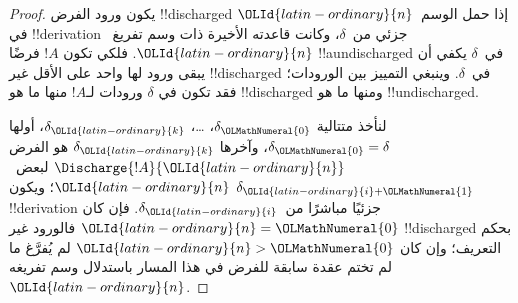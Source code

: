 \documentclass[../../../include/open-logic-section]{subfiles}
\begin{document}
\begin{proof}
  يكون ورود الفرض !!{discharged} إذا
  حمل الوسم~$\OLId{latin-ordinary}{n}$ في !!{derivation}
  جزئي من~$\delta$، وكانت قاعدته
  الأخيرة ذات وسم تفريغ~$\OLId{latin-ordinary}{n}$.
  فلكي تكون $!A$ فرضًا !!a{undischarged}
  في~$\delta$ يكفي أن يبقى ورود لها
  واحد على الأقل غير !!{discharged}
  في~$\delta$. وينبغي التمييز بين
  الورودات؛ فقد تكون في $\delta$
  ورودات لـ$!A$ منها ما هو
  !!{discharged} ومنها ما هو !!{undischarged}.

  لنأخذ متتالية $\delta_\OLMathNumeral{0}$، \dots،
  $\delta_\OLId{latin-ordinary}{k}$، أولها $\delta_\OLMathNumeral{0}=\delta$،
  وآخرها $\delta_\OLId{latin-ordinary}{k}$ هو الفرض
  $\Discharge{!A}{\OLId{latin-ordinary}{n}}$ لبعض~$\OLId{latin-ordinary}{n}$؛
  ويكون $\delta_{\OLId{latin-ordinary}{i}+\OLMathNumeral{1}}$ !!{derivation}
  جزئيًا مباشرًا من~$\delta_\OLId{latin-ordinary}{i}$.
  فإن كان $\OLId{latin-ordinary}{n}=\OLMathNumeral{0}$ فالورود غير !!{discharged}
  بحكم التعريف؛ وإن كان $\OLId{latin-ordinary}{n}>\OLMathNumeral{0}$ لم يُفرَّغ
  ما لم تختم عقدة سابقة للفرض في هذا
  المسار باستدلال وسم تفريغه~$\OLId{latin-ordinary}{n}$.


\end{proof}
\end{document}
